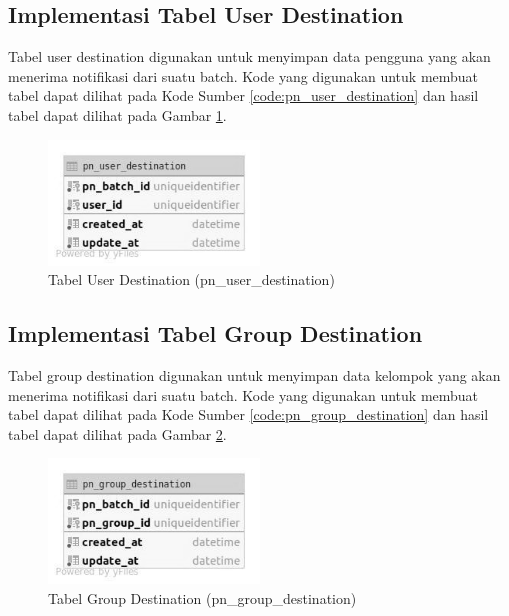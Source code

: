 \subsection{Implementasi Tabel User Destination}
\par Tabel user destination digunakan untuk menyimpan data pengguna yang akan menerima notifikasi dari suatu batch. Kode yang digunakan untuk membuat tabel dapat dilihat pada Kode Sumber \ref{code:pn_user_destination} dan hasil tabel dapat dilihat pada Gambar \ref{tabel_pn_user_destination}.

\begin{figure}[H]
	\caption{Tabel User Destination (pn\_user\_destination)}
	\label{tabel_pn_user_destination}
    \centering\includegraphics[width=0.5\textwidth]{bab4/figures/tabel_pn_user_destination.jpg}
\end{figure}

\subsection{Implementasi Tabel Group Destination}
\par Tabel group destination digunakan untuk menyimpan data kelompok yang akan menerima notifikasi dari suatu batch. Kode yang digunakan untuk membuat tabel dapat dilihat pada Kode Sumber \ref{code:pn_group_destination} dan hasil tabel dapat dilihat pada Gambar \ref{tabel_pn_group_destination}.

\begin{figure}[H]
	\caption{Tabel Group Destination (pn\_group\_destination)}
	\label{tabel_pn_group_destination}
    \centering\includegraphics[width=0.5\textwidth]{bab4/figures/tabel_pn_group_destination.jpg}
\end{figure}


